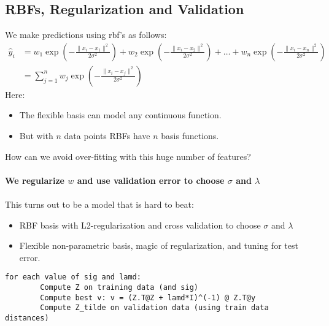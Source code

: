 \documentclass{article}
\def\blu#1{{\color{blu}#1}}
\def\gre#1{{\color{gre}#1}}
\def\red#1{{\color{red}#1}}
\def\norm#1{\|#1\|}
\begin{document}
\subsection*{ RBFs, Regularization and Validation}
We make predictions using rbf's as follows:
\begin{align*}
\hat{y}_i &= w_1 \exp\left(- \frac{\norm{x_i - x_1}^2}{2 \sigma ^2}\right) + w_2 \exp\left(- \frac{\norm{x_i - x_2}^2}{2 \sigma ^2}\right) + \dots + w_n \exp\left(- \frac{\norm{x_i - x_n}^2}{2 \sigma ^2}\right) \\
&= \sum_{j = 1}^{n} w_j \exp\left(- \frac{\norm{x_i - x_j}^2}{2 \sigma ^2}\right)
\end{align*}
Here:
\begin{itemize}
	\item The flexible basis can \gre{model any continuous function}.
	\item But with $ n $ data points RBFs \red{have $ n $ basis functions}.
\end{itemize}
How can we avoid over-fitting with this huge number of features?\\
\\
\textbf{We \blu{regularize} $ w $ and use \blu{validation error} to choose \gre{$ \sigma $ and $ \lambda $}} \\ \\
This turns out to be a model that is hard to beat:
\begin{itemize}
	\item \gre{RBF basis with L2-regularization and cross validation to choose $ \sigma $ and $ \lambda $}
	\item Flexible non-parametric basis, magic of regularization, and tuning for test error.
\end{itemize}
\begin{lstlisting}[tabsize=3]
	for each value of sig and lamd:
		Compute Z on training data (and sig)
		Compute best v: v = (Z.T@Z + lamd*I)^(-1) @ Z.T@y
		Compute Z_tilde on validation data (using train data distances)
\end{lstlisting}
\end{document}
